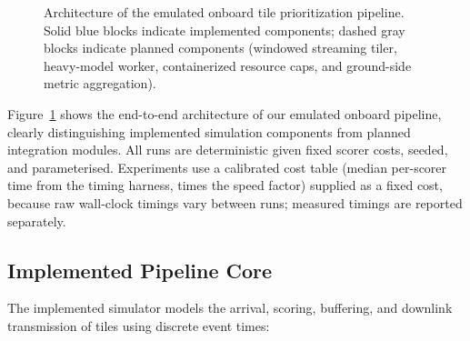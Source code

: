 \documentclass[conference]{IEEEtran}
\begin{document}
\begin{figure}[t]
\caption{Architecture of the emulated onboard tile prioritization pipeline. Solid blue blocks indicate implemented components; dashed gray blocks indicate planned components (windowed streaming tiler, heavy-model worker, containerized resource caps, and ground-side metric aggregation).}
\label{fig:arch}
\end{figure}

Figure~\ref{fig:arch} shows the end-to-end architecture of our emulated onboard pipeline, clearly distinguishing implemented simulation components from planned integration modules. All runs are deterministic given fixed scorer costs, seeded, and parameterised. Experiments use a calibrated cost table (median per-scorer time from the timing harness, times the speed factor) supplied as a fixed cost, because raw wall-clock timings vary between runs; measured timings are reported separately.

\subsection{Implemented Pipeline Core}
The implemented simulator models the arrival, scoring, buffering, and downlink transmission of tiles using discrete event times:
\end{document}
